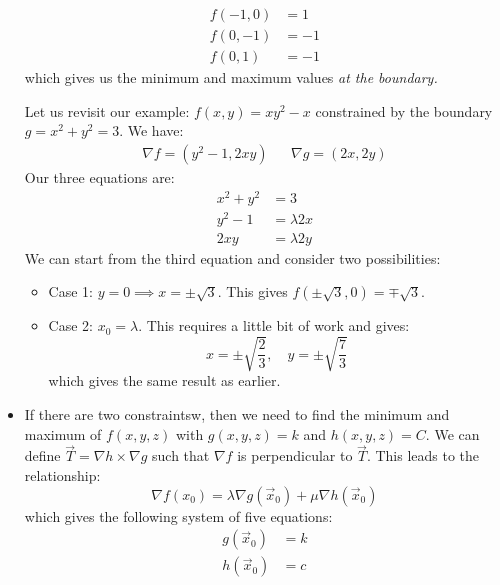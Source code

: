 \begin{itemize}
\begin{example}
\begin{align}
            f(-1, 0) &= 1 \\ 
            f(0,-1) &= -1 \\ 
            f(0, 1) &= -1
        \end{align}
        which gives us the minimum and maximum values \textit{at the boundary.}
    \end{example}
        \begin{example}
        Let us revisit our example: $f(x,y) = xy^2-x$ constrained by the boundary $g=x^2+y^2=3$. We have:
        \begin{align}
            \nabla f = (y^2-1, 2xy) && \nabla g = (2x,2y)
        \end{align}
        Our three equations are:
        \begin{align}
            x^2 + y^2 &= 3 \\ 
            y^2- 1 &= \lambda 2x \\ 
            2xy &= \lambda 2y
        \end{align}
        We can start from the third equation and consider two possibilities:
        \begin{itemize}
            \item Case 1: $y=0 \implies x = \pm \sqrt{3}$. This gives $f(\pm \sqrt{3}, 0) = \mp \sqrt{3}$.
            \item Case 2: $x_0 = \lambda$. This requires a little bit of work and gives:
            \begin{equation}
                x = \pm \sqrt{\frac{2}{3}},\quad y = \pm \sqrt{\frac{7}{3}}
            \end{equation}
            which gives the same result as earlier.
        \end{itemize}
    \end{example}
    \item If there are two constraintsw, then we need to find the minimum and maximum of $f(x,y,z)$ with $g(x,y,z)=k$ and $h(x,y,z)=C$. We can define $\vec{T} = \nabla h \times \nabla g$ such that $\nabla f$ is perpendicular to $\vec{T}$. This leads to the relationship:
    \begin{equation}
        \nabla f(x_0) = \lambda \nabla g(\vec{x}_0) + \mu \nabla h(\vec{x}_0)
    \end{equation}
    which gives the following system of five equations:
    \begin{align}
        g(\vec{x}_0) &= k \\ 
        h(\vec{x}_0) &= c \\ 

\end{align}
\end{itemize}
